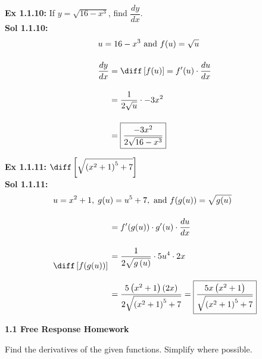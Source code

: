 \textbf{Ex 1.1.10:} If $y = \sqrt{16 - x^3}$, find $\dfrac{dy}{dx}$. \\[11pt]
\textbf{Sol 1.1.10:} \begin{align*}
    & u = 16 - x^3 \text{ and } f(u) = \sqrt{u} \\[11pt]
    & \dfrac{dy}{dx} \begin{aligned}[t]
        & = \diff \left[f(u)\right] = f'(u) \cdot \dfrac{du}{dx} \\[11pt] 
        & = \dfrac{1}{2\sqrt{u}} \cdot -3x^2 \\[11pt]
        & = \boxed{\dfrac{-3x^2}{2\sqrt{16 - x^3}}}
    \end{aligned}
\end{align*} 

\textbf{Ex 1.1.11:} $\diff \left[\sqrt{\left(x^2 + 1\right)^5 + 7}\right]$ \\[11pt]
\textbf{Sol 1.1.11:}\begin{align*}
    & u = x^2 + 1, \; g(u) = u^5 + 7, \text{ and } f(g(u)) = \sqrt{g(u)} \\[11pt]
    & \diff \left[f(g(u))\right] \begin{aligned}
        & = f'(g(u)) \cdot g'(u) \cdot \dfrac{du}{dx} \\[11pt]
        & = \dfrac{1}{2\sqrt{g\left(u\right)}} \cdot 5u^4 \cdot 2x \\[11pt]
        & = \dfrac{5\left(x^2 + 1\right)(2x)}{2\sqrt{\left(x^2 + 1\right)^5 + 7}} = \boxed{\dfrac{5x\left(x^2 + 1\right)}{\sqrt{\left(x^2 + 1\right)^5 + 7}}}
    \end{aligned}
\end{align*}

\newpage

\textbf{\large{1.1 Free Response Homework}} \par

Find the derivatives of the given functions. Simplify where possible. \par

 \\[11pt]
 \\[11pt]
 \\[11pt]
 \\[11pt]
 \\[11pt]

